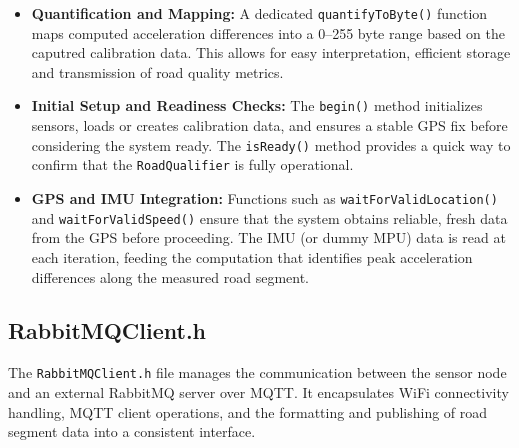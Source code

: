 \begin{itemize}
    \item \textbf{Quantification and Mapping:}  
    A dedicated \texttt{quantifyToByte()} function maps computed acceleration differences into a 0–255 byte range based on the caputred calibration data. This allows for easy interpretation, efficient storage and transmission of road quality metrics.

    \item \textbf{Initial Setup and Readiness Checks:}  
    The \texttt{begin()} method initializes sensors, loads or creates calibration data, and ensures a stable GPS fix before considering the system ready. The \texttt{isReady()} method provides a quick way to confirm that the \texttt{RoadQualifier} is fully operational.

    \item \textbf{GPS and IMU Integration:}  
    Functions such as \texttt{waitForValidLocation()} and \texttt{waitForValidSpeed()} ensure that the system obtains reliable, fresh data from the GPS before proceeding. The IMU (or dummy MPU) data is read at each iteration, feeding the computation that identifies peak acceleration differences along the measured road segment.
\end{itemize}


\subsection{RabbitMQClient.h}

The \texttt{RabbitMQClient.h} file manages the communication between the sensor node and an external RabbitMQ server over MQTT. It encapsulates WiFi connectivity handling, MQTT client operations, and the formatting and publishing of road segment data into a consistent interface.


